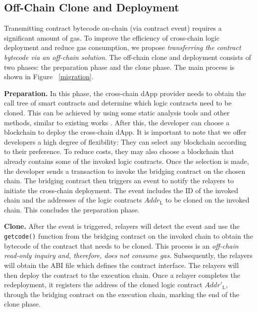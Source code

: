 \subsection{Off-Chain Clone and Deployment}
\label{subsec:migration}

Transmitting contract bytecode on-chain (via contract event) requires a significant amount of gas.
To improve the efficiency of cross-chain logic deployment and reduce gas consumption, we propose \emph{transferring the contract bytecode via an off-chain solution}. 
The off-chain clone and deployment consists of two phases: the preparation phase and the clone phase. 
The main process is shown in Figure ~\ref{migration}.

\vspace{3pt}
\noindent
\textbf{Preparation.}
In this phase, the cross-chain dApp provider needs to obtain the call tree of smart contracts and determine which logic contracts need to be cloned.
This can be achieved by using some static analysis tools \cite{feist2019slither} and other methods, similar to existing works \cite{li2022jenga, robinson2021general, chen2024atomci}.
After this, the developer can choose a blockchain to deploy the cross-chain dApp. 
It is important to note that we offer developers a high degree of flexibility: 
They can select any blockchain according to their preference. 
To reduce costs, they may also choose a blockchain that already contains some of the invoked logic contracts. 
Once the selection is made, the developer sends a transaction to invoke the bridging contract on the chosen chain.
The bridging contract then triggers an event to notify the relayers to initiate the cross-chain deployment.
The event includes the ID of the invoked chain and the addresses of the logic contracts $Addr_{\text{L}}$ to be cloned on the invoked chain. 
This concludes the preparation phase.

\vspace{3pt}
\noindent
\textbf{Clone.}
After the event is triggered, relayers will detect the event and use the \texttt{getcode()} function from the bridging contract on the invoked chain to obtain the bytecode of the contract that needs to be cloned. 
This process is an \emph{off-chain read-only inquiry and, therefore, does not consume gas.}
Subsequently, the relayers will obtain the ABI file which defines the contract interface. 
The relayers will then deploy the contract to the execution chain. 
Once a relayer completes the redeployment, it registers the address of the cloned logic contract $Addr'_{\text{L}}$, through the bridging contract on the execution chain, marking the end of the clone phase.

